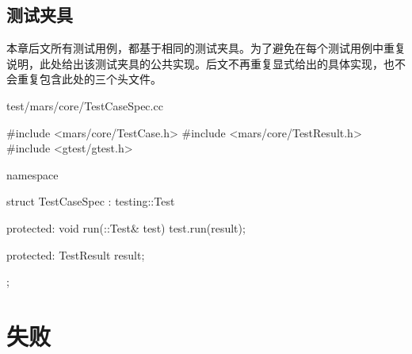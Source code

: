 \begin{content}
\begin{enum}
    \begin{enum}
    \end{enum}
    \begin{enum}
    \end{enum}
    \begin{enum}
    \end{enum}
\end{enum}

\subsection{测试夹具}

本章后文所有测试用例，都基于相同的测试夹具。为了避免在每个测试用例中重复说明，此处给出该测试夹具的公共实现。后文不再重复显式给出的具体实现，也不会重复包含此处的三个头文件。

\begin{nodiff}{test/mars/core/TestCaseSpec.cc}
 \begin{c++}
#include <mars/core/TestCase.h>
#include <mars/core/TestResult.h>
#include <gtest/gtest.h>

namespace {
  struct TestCaseSpec : testing::Test {
  protected:
    void run(::Test& test) {
      test.run(result);
    }

  protected:
    TestResult result;
  };
}
 \end{c++}
\end{nodiff}

\end{content}

\section{失败}

